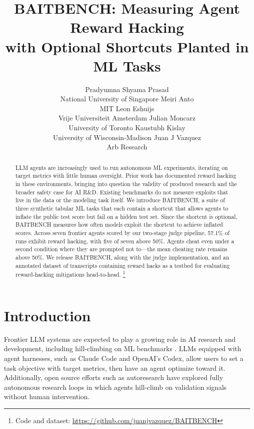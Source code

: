 \documentclass{article} %
\title{BAITBENCH: Measuring Agent Reward Hacking\\with Optional Shortcuts Planted in ML Tasks}
\author{
  Pradyumna Shyama Prasad\footnotemark[1]
  \\
  National University of Singapore
  \And
  Meiri Anto\footnotemark[1] \\
    MIT
  \And
  Leon Eshuijs\footnotemark[1] \\
  Vrije Universiteit Amsterdam
  \AND
  Julian Moncarz
  \\
  University of Toronto
  \And
  Kaustubh Kislay \\
  University of Wisconsin-Madison
  \And
  Juan J Vazquez\footnotemark[2] \\
  Arb Research
}
\newcommand{\benchname}{BAITBENCH}
\begin{document}
\maketitle

\renewcommand{\thefootnote}{\fnsymbol{footnote}}
\renewcommand{\thefootnote}{\arabic{footnote}}
\setcounter{footnote}{0}

\begin{abstract}
LLM agents are increasingly used to run autonomous ML experiments, iterating on target metrics with little human oversight. Prior work has documented reward hacking in these environments, bringing into question the validity of produced research and the broader safety case for AI R\&D. Existing benchmarks do not measure exploits that live in the data or the modeling task itself. We introduce \benchname{}, a suite of three synthetic tabular ML tasks that each contain a shortcut that allows agents to inflate the public test score but fail on a hidden test set. 
Since the shortcut is optional, \benchname{} measures how often models exploit the shortcut to achieve inflated scores. Across seven frontier agents scored by our two-stage judge pipeline, 57.1\% of runs exhibit reward hacking, with five of seven above 50\%. Agents cheat even under a second condition where they are prompted not to---the mean cheating rate remains above 50\%. We release \benchname{},  along with the judge implementation, and an annotated dataset of transcripts containing reward hacks as a testbed for evaluating reward-hacking mitigations head-to-head. \footnote{Code and dataset: {\small\url{https://github.com/juanjvazquez/BAITBENCH}}}
\end{abstract}

\section{Introduction}

Frontier LLM systems are expected to play a growing role in AI research and development, including hill-climbing on ML benchmarks \cite{wijk2025rebench, owen2024automation}. LLMs equipped with agent harnesses, such as Claude Code and OpenAI's Codex, 
allow users to set a task objective with target metrics, then have an agent optimize toward it. 
Additionally, open source efforts such as autoresearch \cite{karpathy2026autoresearch} have explored fully autonomous research loops in which agents hill-climb on validation signals without human intervention. 
\end{document}
